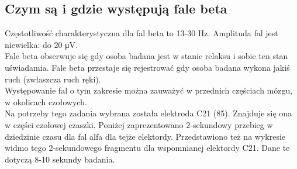 \documentclass{article}
\begin{document}
    \subsection{Czym są i gdzie występują fale beta}
    
    Częstotliwość charakterystyczna dla fal beta to 13-30 Hz. Amplituda fal jest niewielka: do 20 \si{\micro\volt}.\\

    Fale beta obserwuje się gdy osoba badana jest w stanie relaksu i sobie ten stan uświadamia. Fale beta przestaje się rejestrować gdy osoba badana wykona jakiś ruch (zwłaszcza ruch ręki).\\

    Występowanie fal o tym zakresie można zauważyć w przednich częściach mózgu, w okolicach czołowych.\\

    Na potrzeby tego zadania wybrana została elektroda C21 (85). Znajduje się ona w części czołowej czaszki. Poniżej zaprezentowano 2-sekundowy przebieg w dziedzinie czasu dla fal alfa dla tejże elektordy. Przedstawiono też na wykresie widmo tego 2-sekundowego fragmentu dla wspomnianej elektordy C21. Dane te dotyczą 8-10 sekundy badania.

    \newpage
\end{document}
